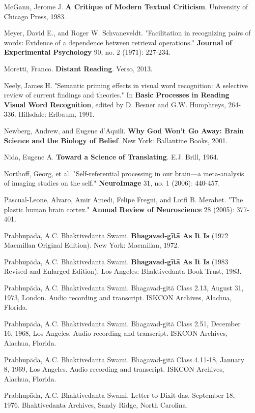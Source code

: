 \documentclass[11pt,twoside]{book}
\begin{document}
McGann, Jerome J. \textbf{A Critique of Modern Textual Criticism}. University of Chicago Press, 1983.

Meyer, David E., and Roger W. Schvaneveldt. "Facilitation in recognizing pairs of words: Evidence of a dependence between retrieval operations." \textbf{Journal of Experimental Psychology} 90, no. 2 (1971): 227-234.

Moretti, Franco. \textbf{Distant Reading}. Verso, 2013.

Neely, James H. "Semantic priming effects in visual word recognition: A selective review of current findings and theories." In \textbf{Basic Processes in Reading Visual Word Recognition}, edited by D. Besner and G.W. Humphreys, 264-336. Hillsdale: Erlbaum, 1991.

Newberg, Andrew, and Eugene d'Aquili. \textbf{Why God Won't Go Away: Brain Science and the Biology of Belief}. New York: Ballantine Books, 2001.

Nida, Eugene A. \textbf{Toward a Science of Translating}. E.J. Brill, 1964.

Northoff, Georg, et al. "Self-referential processing in our brain—a meta-analysis of imaging studies on the self." \textbf{NeuroImage} 31, no. 1 (2006): 440-457.

Pascual-Leone, Alvaro, Amir Amedi, Felipe Fregni, and Lotfi B. Merabet. "The plastic human brain cortex." \textbf{Annual Review of Neuroscience} 28 (2005): 377-401.

Prabhupāda, A.C. Bhaktivedanta Swami. \textbf{Bhagavad-gītā As It Is} (1972 Macmillan Original Edition). New York: Macmillan, 1972.

Prabhupāda, A.C. Bhaktivedanta Swami. \textbf{Bhagavad-gītā As It Is} (1983 Revised and Enlarged Edition). Los Angeles: Bhaktivedanta Book Trust, 1983.

Prabhupāda, A.C. Bhaktivedanta Swami. Bhagavad-gītā Class 2.13, August 31, 1973, London. Audio recording and transcript. ISKCON Archives, Alachua, Florida.

Prabhupāda, A.C. Bhaktivedanta Swami. Bhagavad-gītā Class 2.51, December 16, 1968, Los Angeles. Audio recording and transcript. ISKCON Archives, Alachua, Florida.

Prabhupāda, A.C. Bhaktivedanta Swami. Bhagavad-gītā Class 4.11-18, January 8, 1969, Los Angeles. Audio recording and transcript. ISKCON Archives, Alachua, Florida.

Prabhupāda, A.C. Bhaktivedanta Swami. Letter to Dixit das, September 18, 1976. Bhaktivedanta Archives, Sandy Ridge, North Carolina.
\end{document}
